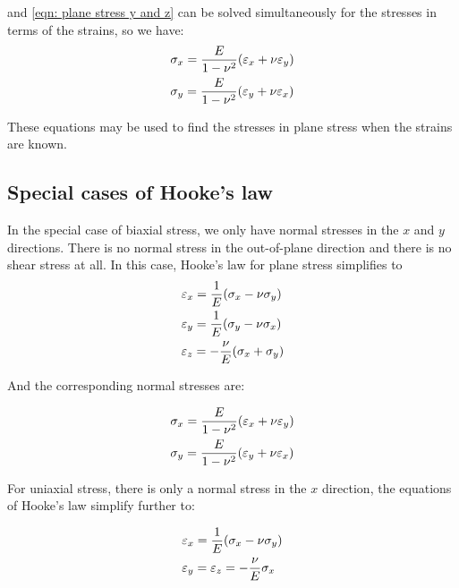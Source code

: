 \documentclass[
10pt,
a4paper,
openany,
svgnames,
]{book} %
\begin{document}
 and \cref{eqn: plane stress y and z} can be solved simultaneously for the stresses in terms of the strains, so we have:
\begin{equation}
  \begin{gathered}
    \sigma_x = \frac{E}{1 - \nu^2}(\varepsilon_x + \nu \varepsilon_y) \hfill \\
    \sigma_y = \frac{E}{1 - \nu^2}(\varepsilon_y + \nu \varepsilon_x) \hfill \\ 
  \end{gathered}
\end{equation}

These equations may be used to find the stresses in plane stress when the strains are known.

\subsection{Special cases of Hooke’s law}

In the special case of biaxial stress, we only have normal stresses in the $x$ and $y$ directions. There is no normal stress in the out-of-plane direction and there is no shear stress at all. In this case, Hooke’s law for plane stress simplifies to
\begin{equation}
  \begin{gathered}
    \varepsilon_x = \frac{1}{E}(\sigma_x - \nu \sigma_y) \hfill \\
    \varepsilon_y = \frac{1}{E}(\sigma_y - \nu \sigma_x) \hfill \\
    \varepsilon_z =  - \frac{\nu }{E}(\sigma_x + \sigma_y) \hfill \\ 
  \end{gathered}
\end{equation}

And the corresponding normal stresses are:

\begin{equation}
  \begin{gathered}
    \sigma_x = \frac{E}{1 - \nu^2}(\varepsilon_x + \nu \varepsilon_y) \hfill \\
    \sigma_y = \frac{E}{1 - \nu^2}(\varepsilon_y + \nu \varepsilon_x) \hfill
  \end{gathered}
\end{equation}

For uniaxial stress, there is only a normal stress in the $x$ direction, the equations of Hooke’s law simplify further to:

\begin{equation}
  \begin{gathered}
    \varepsilon_x = \frac{1}{E}({\sigma _x} - \nu \sigma_y) \hfill \\
    \varepsilon_y = {\varepsilon _z} =  - \frac{\nu }{E}{\sigma _x} \hfill \\ 
  \end{gathered}
\end{equation}
\end{document}
